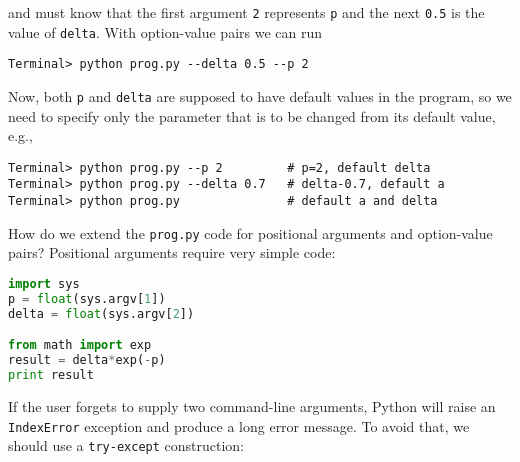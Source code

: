 \documentclass[graybox,sectrefs,envcountresetchap,open=right,final]{svmonodo}
\begin{document}
and must know that the first argument \texttt{2} represents \texttt{p} and the
next \texttt{0.5} is the value of \texttt{delta}.
With option-value pairs we can run



\begin{Verbatim}[frame=lines,label=\fbox{{\tiny Terminal}},framesep=2.5mm,framerule=0.7pt,fontsize=\fontsize{9pt}{9pt}]
Terminal> python prog.py --delta 0.5 --p 2

\end{Verbatim}

Now, both \texttt{p} and \texttt{delta} are supposed to have default values in the program,
so we need to specify only the parameter that is to be changed from
its default value, e.g.,





\begin{Verbatim}[frame=lines,label=\fbox{{\tiny Terminal}},framesep=2.5mm,framerule=0.7pt,fontsize=\fontsize{9pt}{9pt}]
Terminal> python prog.py --p 2         # p=2, default delta
Terminal> python prog.py --delta 0.7   # delta-0.7, default a
Terminal> python prog.py               # default a and delta

\end{Verbatim}


How do we extend the \texttt{prog.py} code for positional arguments
and option-value pairs? Positional arguments require very simple
code:









\begin{lstlisting}[language=python,style=blue1bar_bluegreen]
import sys
p = float(sys.argv[1])
delta = float(sys.argv[2])

from math import exp
result = delta*exp(-p)
print result

\end{lstlisting}

If the user forgets to supply two command-line arguments, Python will
raise an \texttt{IndexError} exception and produce a long error message.
To avoid that, we should use a \texttt{try-except} construction:
\end{document}
